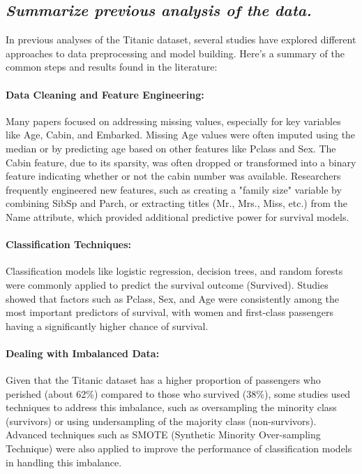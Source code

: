 \documentclass[twoside,11pt]{article}
\makeatletter
\let\@oldsubsection\subsection
\renewcommand\subsection[1]{\@oldsubsection*{\textit{#1}}}
\makeatother
\begin{document}
\subsection{Summarize previous analysis of the data.}

In previous analyses of the Titanic dataset, several studies have explored different approaches to data preprocessing and model building. Here’s a summary of the common steps and results found in the literature:

\paragraph{Data Cleaning and Feature Engineering:} Many papers focused on addressing missing values, especially for key variables like Age, Cabin, and Embarked. Missing Age values were often imputed using the median or by predicting age based on other features like Pclass and Sex. The Cabin feature, due to its sparsity, was often dropped or transformed into a binary feature indicating whether or not the cabin number was available. Researchers frequently engineered new features, such as creating a "family size" variable by combining SibSp and Parch, or extracting titles (Mr., Mrs., Miss, etc.) from the Name attribute, which provided additional predictive power for survival models.

\paragraph{Classification Techniques:} Classification models like logistic regression, decision trees, and random forests were commonly applied to predict the survival outcome (Survived). Studies showed that factors such as Pclass, Sex, and Age were consistently among the most important predictors of survival, with women and first-class passengers having a significantly higher chance of survival.

\paragraph{Dealing with Imbalanced Data:} Given that the Titanic dataset has a higher proportion of passengers who perished (about 62\%) compared to those who survived (38\%), some studies used techniques to address this imbalance, such as oversampling the minority class (survivors) or using undersampling of the majority class (non-survivors). Advanced techniques such as SMOTE (Synthetic Minority Over-sampling Technique) were also applied to improve the performance of classification models in handling this imbalance.
\end{document}
